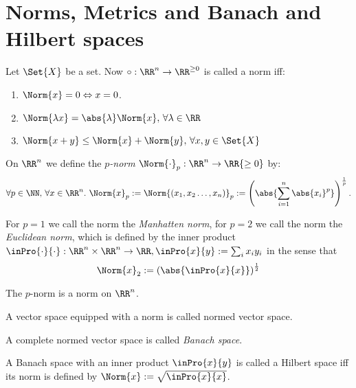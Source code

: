 \section{Norms, Metrics and Banach and Hilbert spaces}
\begin{defn}
 Let $\Set{X}$ be a set. Now $\circ:\RR^n\to\RR^{\geq 0}$ is called a norm iff:
 \begin{enumerate}
  \item $\Norm{x}=0\Leftrightarrow x=0$.
  \item $\Norm{\lambda x}=\abs{\lambda}\Norm{x}, \,\forall \lambda\in\RR$
  \item $\Norm{x+y}\leq\Norm{x}+\Norm{y}, \,\forall x,y\in\Set{X}$
 \end{enumerate}
\end{defn}
\begin{defn}[$p$-norm]
 On $\RR^n$ we define the \emph{$p$-norm} $\Norm{\cdot}_p:\RR^n\to\RR{\geq 0}$ by:
 $$\forall p\in\NN,\, \forall x\in\RR^n.\ \Norm{x}_p:=\Norm{(x_1, x_2\ldots, x_n)}_p:=\left(\abs{\sum_{i=1}^{n}\abs{x_i}^p}\right)^{\frac{1}{p}}.$$
\end{defn}
For $p=1$ we call the norm the \emph{Manhatten norm}, for $p=2$ we call the norm the \emph{Euclidean norm}, which is defined by the inner product $\inPro{\cdot}{\cdot}:\RR^n\times \RR^n\to\RR, \inPro{x}{y}:=\sum_{i}x_iy_i$ in the sense that $$\Norm{x}_2:=\left(\abs{\inPro{x}{x}}\right)^\frac{1}{2}$$
\begin{exc}
 The $p$-norm is a norm on $\RR^n$. 
\end{exc}
\begin{defn}
 A vector space equipped with a norm is called normed vector space.
\end{defn}
\begin{defn}
 A complete normed vector space is called \emph{Banach space}.
\end{defn}
\begin{defn}
 A Banach space with an inner product $\inPro{x}{y}$ is called a Hilbert space iff its norm is defined by $\Norm{x}:=\sqrt{\inPro{x}{x}}$.
\end{defn}

